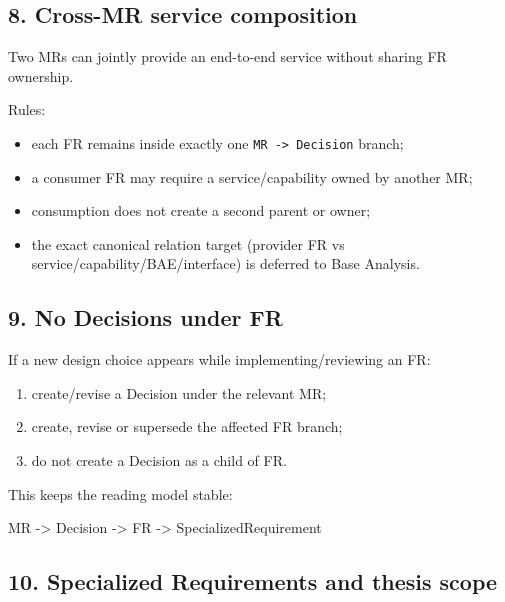 \documentclass[
  10pt,
]{article}
\newenvironment{Shaded}{}{}
\newcommand{\NormalTok}[1]{#1}
\providecommand{\tightlist}{%
  \setlength{\itemsep}{0pt}\setlength{\parskip}{0pt}}
\begin{document}
\subsection{8. Cross-MR service
composition}\label{8-cross-mr-service-composition}

Two MRs can jointly provide an end-to-end service without sharing FR
ownership.

Rules:

\begin{itemize}
\tightlist
\item
  each FR remains inside exactly one
  \texttt{MR\ -\textgreater{}\ Decision} branch;
\item
  a consumer FR may require a service/capability owned by another MR;
\item
  consumption does not create a second parent or owner;
\item
  the exact canonical relation target (provider FR vs
  service/capability/BAE/interface) is deferred to Base Analysis.
\end{itemize}

\subsection{9. No Decisions under FR}\label{9-no-decisions-under-fr}

If a new design choice appears while implementing/reviewing an FR:

\begin{enumerate}
\def\labelenumi{\arabic{enumi}.}
\tightlist
\item
  create/revise a Decision under the relevant MR;
\item
  create, revise or supersede the affected FR branch;
\item
  do not create a Decision as a child of FR.
\end{enumerate}

This keeps the reading model stable:

\begin{Shaded}
\begin{Highlighting}[]
\NormalTok{MR {-}\textgreater{} Decision {-}\textgreater{} FR {-}\textgreater{} SpecializedRequirement}
\end{Highlighting}
\end{Shaded}

\subsection{10. Specialized Requirements and thesis
scope}\label{10-specialized-requirements-and-thesis-scope}
\end{document}
